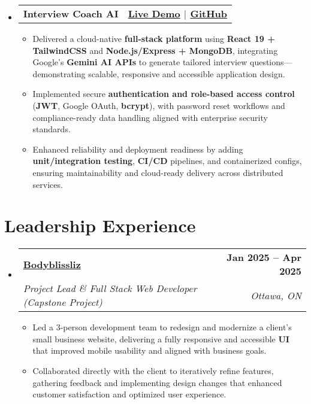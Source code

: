 \documentclass[letterpaper, 10pt]{article}
\makeatletter
\newcommand{\resumeItem}[1]{\item\small{{#1 \vspace{0pt}}}}
\newcommand{\resumeSubheading}[4]{
  \vspace{-2pt}\item
    \begin{tabular*}{1.0\textwidth}[t]{l@{\extracolsep{\fill}}r}
      \textbf{#1} & \textbf{\small #2} \\
      \textit{\small#3} & \textit{\small #4} \\
    \end{tabular*}\vspace{-7pt}
}
\newcommand{\resumeProjectHeading}[2]{
    \item
    \begin{tabular*}{1.001\textwidth}{l@{\extracolsep{\fill}}r}
      \small#1 & \textbf{\small #2}\\
    \end{tabular*}\vspace{-7pt}
}
\newcommand{\resumeItemListStart}{\begin{itemize}}
\newcommand{\resumeItemListEnd}{\end{itemize}\vspace{-5pt}}
\newcommand{\resumeSubHeadingListStart}{\begin{itemize}[leftmargin=0.0in, label={}]}
\newcommand{\resumeSubHeadingListEnd}{\end{itemize}}
\makeatother
\begin{document}
\resumeSubHeadingListStart
\resumeProjectHeading{\textbf{Interview Coach AI}}
{\href{https://interviewcoach-ai.vercel.app}{Live Demo} $|$ \href{https://github.com/altansaid/interviewcoach-ai}{GitHub}}

\resumeItemListStart
    \resumeItem{Delivered a cloud-native \textbf{full-stack platform} using \textbf{React 19 + TailwindCSS} and \textbf{Node.js/Express + MongoDB}, integrating Google’s \textbf{Gemini AI APIs} to generate tailored interview questions—demonstrating scalable, responsive and accessible application design.}
    
    \resumeItem{Implemented secure \textbf{authentication and role-based access control} (\textbf{JWT}, Google OAuth, \textbf{bcrypt}), with password reset workflows and compliance-ready data handling aligned with enterprise security standards.}
    
    \resumeItem{Enhanced reliability and deployment readiness by adding \textbf{unit/integration testing}, \textbf{CI/CD} pipelines, and containerized configs, ensuring maintainability and cloud-ready delivery across distributed services.}
\resumeItemListEnd
\resumeSubHeadingListEnd


\section{Leadership Experience}

\resumeSubHeadingListStart

\resumeSubheading
  {\href{https://www.bodyblissliz.com/}{Bodyblissliz}}{Jan 2025 -- Apr 2025}
  {Project Lead \& Full Stack Web Developer (Capstone Project)}{Ottawa, ON}
  \vspace{1pt}
  \resumeItemListStart
     \resumeItem{Led a 3-person development team to redesign and modernize a client’s small business website, delivering a fully responsive and accessible \textbf{UI} that improved mobile usability and aligned with business goals.}
    \resumeItem{Collaborated directly with the client to iteratively refine features, gathering feedback and implementing design changes that enhanced customer satisfaction and optimized user experience.}
  \resumeItemListEnd
\resumeSubHeadingListEnd



\end{document}
